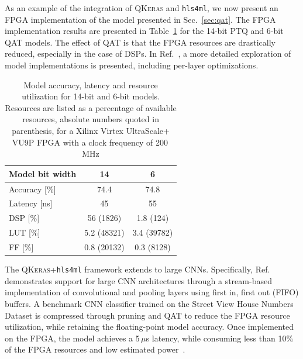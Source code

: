 \documentclass[sigconf]{acmart}
\newcommand{\hlsfml}{\texttt{hls4ml}\xspace}
\begin{document}
As an example of the integration of \textsc{QKeras} and \hlsfml, we now present an FPGA implementation of the model presented in Sec.~\ref{sec:qat}. 
The FPGA implementation results are presented in Table~\ref{tab:performance} for the 14-bit PTQ and 6-bit QAT models.  
The effect of QAT is that the FPGA resources are drastically reduced, especially in the case of DSPs.  
In Ref.~\cite{Coelho:2020zfu}, a more detailed exploration of model implementations is presented, including per-layer optimizations.

\begin{table}[t!]
\centering
\begin{tabular}{l|cc}
Model bit width & 14 & 6 \\
\hline
Accuracy [\%] & 74.4 & 74.8 \\ 
Latency [ns] & 45 & 55 \\ 
DSP [\%]  & 56 (1826) & 1.8 (124) \\ 
LUT [\%]  & 5.2 (48321) & 3.4 (39782) \\ 
FF [\%]  & 0.8 (20132) & 0.3 (8128) \\ 
\end{tabular}
\caption{Model accuracy, latency and resource utilization for 14-bit and 6-bit models. 
Resources are listed as a percentage of available resources, absolute numbers quoted in parenthesis, for a Xilinx Virtex UltraScale+ VU9P FPGA with a clock frequency of 200\,MHz}
\vspace{-0.5cm}
\label{tab:performance}
\end{table} 

The \textsc{QKeras}+\hlsfml framework extends to large CNNs.
Specifically, Ref.~\cite{Aarrestad:2021zos} demonstrates support for large CNN architectures through a stream-based implementation of convolutional and pooling layers using first in, first out (FIFO) buffers. 
A benchmark CNN classifier trained on the Street View House Numbers Dataset is compressed through pruning and QAT to reduce the FPGA resource utilization, while retaining the floating-point model accuracy. 
Once implemented on the FPGA, the model achieves a 5\,$\mu$s latency, while consuming less than 10\% of the FPGA resources and low estimated power~\cite{horowitz}.

\end{document}
